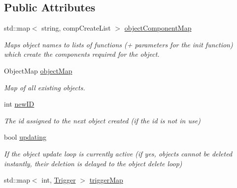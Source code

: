 \subsection*{\-Public \-Attributes}
\begin{DoxyCompactItemize}
\item 
\hypertarget{classObjectManager_ab1976369e21885575b8de234d84bd912}{
std\-::map$<$ string, comp\-Create\-List $>$ \hyperlink{classObjectManager_ab1976369e21885575b8de234d84bd912}{object\-Component\-Map}}
\label{d6/d6f/classObjectManager_ab1976369e21885575b8de234d84bd912}

\begin{DoxyCompactList}\small\item\em \-Maps object names to lists of functions (+ parameters for the init function) which create the components required for the object. \end{DoxyCompactList}\item 
\hypertarget{classObjectManager_ac9661ed13a7ef1db6cff6e5e6db1880b}{
\-Object\-Map \hyperlink{classObjectManager_ac9661ed13a7ef1db6cff6e5e6db1880b}{object\-Map}}
\label{d6/d6f/classObjectManager_ac9661ed13a7ef1db6cff6e5e6db1880b}

\begin{DoxyCompactList}\small\item\em \-Map of all existing objects. \end{DoxyCompactList}\item 
\hypertarget{classObjectManager_a8a4b9cd0ec9499de2937c8891d5b6625}{
int \hyperlink{classObjectManager_a8a4b9cd0ec9499de2937c8891d5b6625}{new\-I\-D}}
\label{d6/d6f/classObjectManager_a8a4b9cd0ec9499de2937c8891d5b6625}

\begin{DoxyCompactList}\small\item\em \-The id assigned to the next object created (if the id is not in use) \end{DoxyCompactList}\item 
\hypertarget{classObjectManager_af1c99cb2cff2e4333576d27dc1b2adf5}{
bool \hyperlink{classObjectManager_af1c99cb2cff2e4333576d27dc1b2adf5}{updating}}
\label{d6/d6f/classObjectManager_af1c99cb2cff2e4333576d27dc1b2adf5}

\begin{DoxyCompactList}\small\item\em \-If the object update loop is currently active (if yes, objects cannot be deleted instantly, their deletion is delayed to the object delete loop) \end{DoxyCompactList}\item 
\hypertarget{classObjectManager_a800777a8713c5db92541aca23c81a424}{
std\-::map$<$ int, \hyperlink{classTrigger}{\-Trigger} $>$ \hyperlink{classObjectManager_a800777a8713c5db92541aca23c81a424}{trigger\-Map}}
\label{d6/d6f/classObjectManager_a800777a8713c5db92541aca23c81a424}


\end{DoxyCompactItemize}

